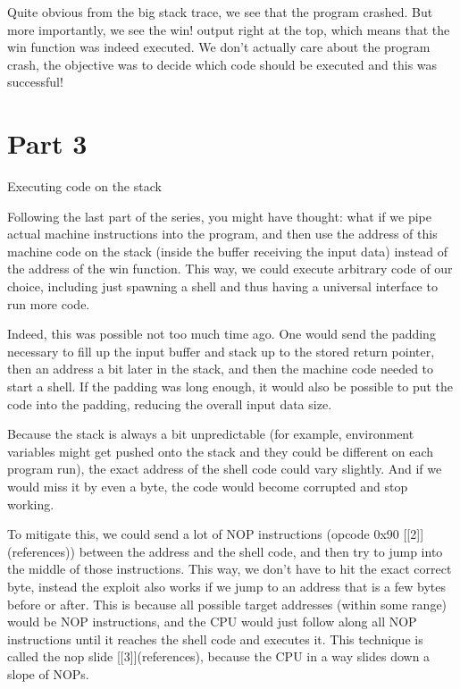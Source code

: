 Quite obvious from the big stack trace, we see that the program crashed. But more importantly, we see the win! output
right at the top, which means that the win function was indeed executed. We don't actually care about the program
crash, the objective was to decide which code should be executed and this was successful!




\section{Part 3}

 Executing code on the stack

Following the last part of the series, you might have thought: what if we pipe actual machine instructions into the
program, and then use the address of this machine code on the stack (inside the buffer receiving the input data) instead
of the address of the win function. This way, we could execute arbitrary code of our choice, including just spawning
a shell and thus having a universal interface to run more code.

Indeed, this was possible not too much time ago. One would send the padding necessary to fill up the input buffer and
stack up to the stored return pointer, then an address a bit later in the stack, and then the machine code needed to
start a shell. If the padding was long enough, it would also be possible to put the code into the padding, reducing the
overall input data size.

Because the stack is always a bit unpredictable (for example, environment variables might get pushed onto the stack and
they could be different on each program run), the exact address of the shell code could vary slightly. And if we would
miss it by even a byte, the code would become corrupted and stop working.

To mitigate this, we could send a lot of NOP instructions (opcode 0x90 [[2]](references)) between the address and the shell code, and
then try to jump into the middle of those instructions. This way, we don't have to hit the exact correct byte, instead
the exploit also works if we jump to an address that is a few bytes before or after. This is because all possible
target addresses (within some range) would be NOP instructions, and the CPU would just follow along all NOP
instructions until it reaches the shell code and executes it. This technique is called the nop slide [[3]](references), because the CPU in
a way slides down a slope of NOPs.

